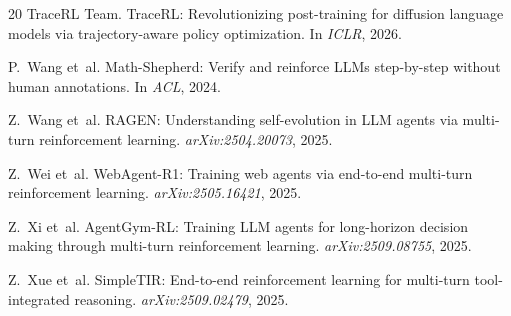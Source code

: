 \documentclass{article}
\begin{document}
\begin{thebibliography}{20}
TraceRL Team.
\newblock TraceRL: Revolutionizing post-training for diffusion language models via trajectory-aware policy optimization.
\newblock In \emph{ICLR}, 2026.

P.~Wang et~al.
\newblock Math-Shepherd: Verify and reinforce LLMs step-by-step without human annotations.
\newblock In \emph{ACL}, 2024.

Z.~Wang et~al.
\newblock RAGEN: Understanding self-evolution in LLM agents via multi-turn reinforcement learning.
\newblock \emph{arXiv:2504.20073}, 2025.

Z.~Wei et~al.
\newblock WebAgent-R1: Training web agents via end-to-end multi-turn reinforcement learning.
\newblock \emph{arXiv:2505.16421}, 2025.

Z.~Xi et~al.
\newblock AgentGym-RL: Training LLM agents for long-horizon decision making through multi-turn reinforcement learning.
\newblock \emph{arXiv:2509.08755}, 2025.

Z.~Xue et~al.
\newblock SimpleTIR: End-to-end reinforcement learning for multi-turn tool-integrated reasoning.
\newblock \emph{arXiv:2509.02479}, 2025.

\end{thebibliography}
\end{document}
